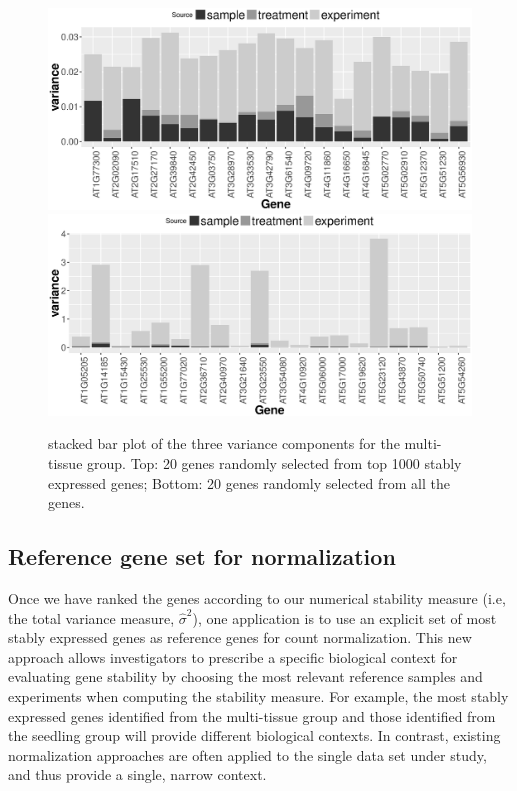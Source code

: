 \documentclass[letterpaper,12pt]{article}
\begin{document}
\begin{figure}[!h]
	\centering
	\includegraphics[width=1\linewidth]{Figures/top1000.eps}
	\includegraphics[width=1\linewidth]{Figures/all.eps}
	\caption{stacked bar plot of the three variance components for the multi-tissue group. Top: 20 genes randomly selected from top 1000 stably expressed genes; Bottom: 20 genes randomly selected from all the genes.}
	\label{fig:all}
\end{figure}


\subsection{Reference gene set for normalization}
\label{Section:commonReference}

Once we have ranked the genes according to our numerical stability measure
(i.e, the total variance measure, $\hat\sigma^2$), one application is to use
an explicit set of most stably expressed genes as reference genes for count
normalization.  This new approach allows investigators to prescribe a specific
biological context for evaluating gene stability by choosing the most relevant
reference samples and experiments when computing the stability measure.  For
example, the most stably expressed genes identified from the multi-tissue
group and those identified from the seedling group will provide different
biological contexts. In contrast, existing normalization approaches are often
applied to the single data set under study, and thus provide a single, narrow
context.
\end{document}

